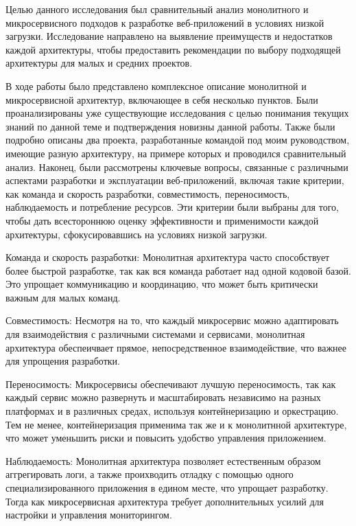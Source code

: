 
    Целью данного исследования был сравнительный анализ монолитного и микросервисного подходов к разработке веб-приложений в условиях низкой загрузки. Исследование направлено на выявление преимуществ и недостатков каждой архитектуры, чтобы предоставить рекомендации по выбору подходящей архитектуры для малых и средних проектов.

    В ходе работы было представлено комплексное описание монолитной и микросервисной архитектур, включающее в себя несколько пунктов. Были проанализированы уже существующие исследования с целью понимания текущих знаний по данной теме и подтверждения новизны данной работы. Также были подробно описаны два проекта, разработанные командой под моим руководством, имеющие разную архитектуру, на примере которых и проводился сравнительный анализ. Наконец, были рассмотрены ключевые вопросы, связанные с различными аспектами разработки и эксплуатации веб-приложений, включая такие критерии, как команда и скорость разработки, совместимость, переносимость, наблюдаемость и потребление ресурсов. Эти критерии были выбраны для того, чтобы дать всестороннюю оценку эффективности и применимости каждой архитектуры, сфокусировавшись на условиях низкой загрузки.
    
    Команда и скорость разработки: Монолитная архитектура часто способствует более быстрой разработке, так как вся команда работает над одной кодовой базой. Это упрощает коммуникацию и координацию, что может быть критически важным для малых команд.
    
    Совместимость: Несмотря на то, что каждый микросервис можно адаптировать для взаимодействия с различными системами и сервисами, монолитная архитектура обеспеичвает прямое, непосредственное взаимодействие, что важнее для упрощения разработки.
    
    Переносимость: Микросервисы обеспечивают лучшую переносимость, так как каждый сервис можно развернуть и масштабировать независимо на разных платформах и в различных средах, используя контейнеризацию и оркестрацию. Тем не менее, контейнеризация применима так же и к монолитнной архитектуре, что может уменьшить риски и повысить удобство управления приложением.
    
    Наблюдаемость: Монолитная архитектура позволяет естественным образом аггрегировать логи, а также проихводить отладку с помощью одного специализированного приложения в едином месте, что упрощает разработку. Тогда как микросервисная архитектура требует дополнительных усилий для настройки и управления мониторингом.
    
